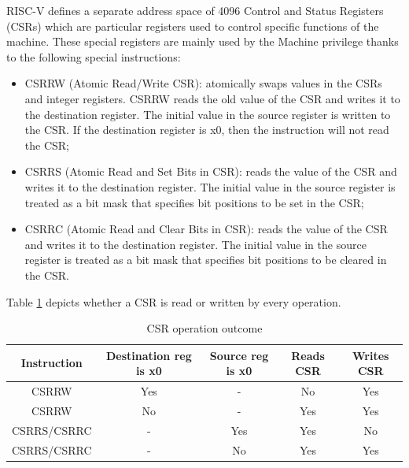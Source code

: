 RISC-V defines a separate address space of 4096 Control and Status Registers (CSRs)
which are particular registers used to control specific functions of the machine.
These special registers are mainly used by the Machine privilege thanks to the
following special instructions:
\begin{itemize}
  \item CSRRW (Atomic Read/Write CSR): atomically swaps values in the CSRs and
    integer registers. CSRRW reads the old value of the CSR and writes it to the
    destination register. The initial value in the source register is written to
    the CSR. If the destination register is x0, then the instruction will not
    read the CSR;

  \item CSRRS (Atomic Read and Set Bits in CSR): reads the value of the CSR and
    writes it to the destination register. The initial value in the source register
    is treated as a bit mask that specifies bit positions to be set in the CSR;

  \item CSRRC (Atomic Read and Clear Bits in CSR): reads the value of the CSR
    and writes it to the destination register. The initial value in the source register
    is treated as a bit mask that specifies bit positions to be cleared in the CSR.
\end{itemize}

Table \ref{tab:csrop} depicts whether a CSR is read or written by every
operation.
\begin{table}
  \centering
  \begin{tabular}{|c|c|c|c|c|}
    \hline
    \textbf{Instruction} & \textbf{Destination reg is x0} & \textbf{Source reg is x0} & \textbf{Reads CSR} & \textbf{Writes CSR} \\
    \hline
    CSRRW                & Yes                            & -                         & No                 & Yes                 \\
    \hline
    CSRRW                & No                             & -                         & Yes                & Yes                 \\
    \hline
    CSRRS/CSRRC          & -                              & Yes                       & Yes                & No                  \\
    \hline
    CSRRS/CSRRC          & -                              & No                        & Yes                & Yes                 \\
    \hline
  \end{tabular}
  \caption{CSR operation outcome}
  \label{tab:csrop}
\end{table}

